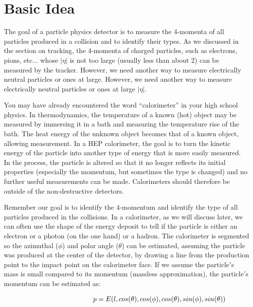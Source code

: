 \section{Basic Idea}

\noindent
The goal of a particle physics detector is to measure the 4-momenta of all particles produced in a collision and to identify their types.  As we discussed in the section on tracking, the 4-momenta of charged particles, such as electrons, pions, etc... whose $\left | \eta  \right |$ is not too large (usually less than about 2) can be measured by the tracker. However, we need another way to measure electrically neutral particles or ones at large. However, we need another way to measure electrically neutral particles or ones at large $\left | \eta  \right |$.

\;
\noindent
You may have already encountered the word ``calorimeter'' in your high school physics.  In thermodynamics, the temperature of a known (hot) object may be measured by immersing it in a bath and measuring the temperature rise of the bath.  The heat energy of the unknown object becomes that of a known object, allowing measurement. In a HEP calorimeter, the goal is to turn the kinetic energy of the particle into another type of energy that is more easily measured. In the process, the particle is altered so that it no longer reflects its initial properties (especially the momentum, but sometimes the type is changed) and no further useful measurements can be made.  Calorimeters should therefore be outside of the non-destructive detectors.

\;
\noindent
Remember our goal is to identify the 4-momentum and identify the type of all particles produced in the collisions. In a calorimeter, as we will discuss later, we can often use the shape of the energy deposit to tell if the particle is  either an electron or a photon (on the one hand) or a hadron. The calorimeter is segmented so the azimuthal ($\phi$) and polar angle ($\theta$) can be estimated, assuming the particle was produced at the center of the detector, by drawing a line from the production point to the impact point on the calorimeter face. If we assume the particle$'$s mass is small compared to its momentum (massless approximation), the particle$'$s momentum can be estimated as:

\begin{equation}\hspace{34 mm}p = E(l,cos(\theta ),cos(\phi ),cos(\theta ),sin(\phi ),sin(\theta ))\end{equation}

